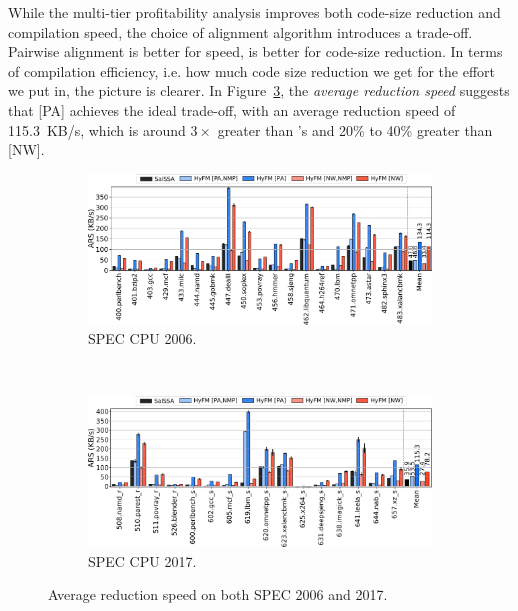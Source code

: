 While the multi-tier profitability analysis improves both code-size reduction and compilation speed, the choice of alignment algorithm introduces a trade-off. Pairwise alignment is better for speed, {\NW} is better for code-size reduction. 
In terms of compilation efficiency, i.e. how much code size reduction we get for the effort we put in, the picture is clearer. In Figure~\ref{fig:ars-both}, the \textit{average reduction speed} suggests that {[PA]} achieves the ideal trade-off, with an average reduction speed of 115.3~KB/s, which is around $3\times$ greater than {\SOAName}'s and 20\% to 40\% greater than [NW].


 \begin{figure}[h]
   \centering
 \begin{subfigure}{\textwidth}
 \center
   \includegraphics[width=\textwidth]{src/lctes21/figs/ars-spec06.pdf}
 \caption{SPEC CPU 2006.}
 \label{fig:ars-spec06}
 \end{subfigure}
 \\
 \begin{subfigure}{\textwidth}
 \center
   \includegraphics[width=\textwidth]{src/lctes21/figs/ars-spec17.pdf}
 \caption{SPEC CPU 2017.}
 \label{fig:ars-spec17}
 \end{subfigure}
 \caption{Average reduction speed on both SPEC 2006 and 2017.}
  \label{fig:ars-both}
 \end{figure}

